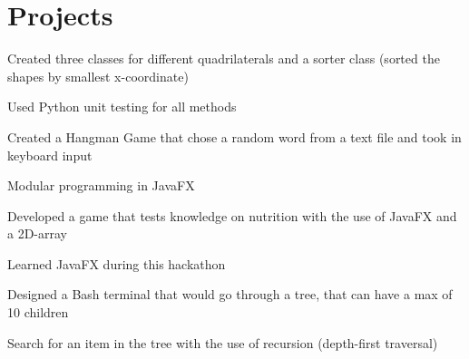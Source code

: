 \section{Projects}

\begin{tightemize}
\item Created three classes for different quadrilaterals and a sorter class (sorted the shapes by smallest x-coordinate)
\item Used Python unit testing for all methods
\end{tightemize}
\sectionsep

\begin{tightemize}
\item Created a Hangman Game that chose a random word from a text file and took in keyboard input
\item Modular programming in JavaFX
\end{tightemize}
\sectionsep

\begin{tightemize}
\item Developed a game that tests knowledge on nutrition with the use of JavaFX and a 2D-array
\item  Learned JavaFX during this hackathon
\end{tightemize}
\sectionsep

\begin{tightemize}
\item Designed a Bash terminal that would go through a tree, that can have a max of 10 children
\item Search for an item in the tree with the use of recursion (depth-first traversal)
\end{tightemize}